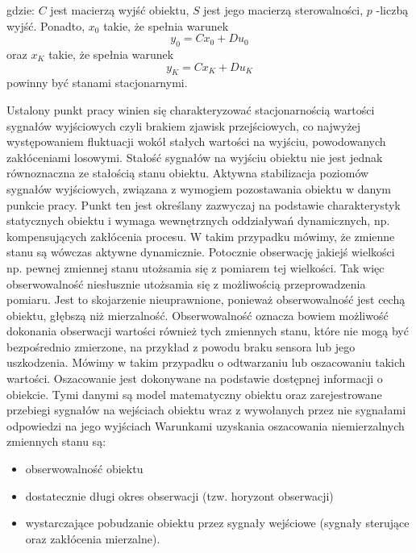 \documentclass{article}
\begin{document}
		gdzie: $C$ jest macierzą wyjść obiektu, $S$ jest jego macierzą sterowalności, $p$ -liczbą wyjść.
		Ponadto, $x_0$ takie, że spełnia warunek 
		\begin{equation}
			y_0 = C x_0+ D u_0
		\end{equation}
		oraz $x_K$ takie, że spełnia warunek
		\begin{equation}
			y_K = C x_K+ D u_K
		\end{equation}
		powinny być stanami stacjonarnymi.

		Ustalony punkt pracy winien się charakteryzować stacjonarnością wartości sygnałów
		wyjściowych czyli brakiem zjawisk przejściowych, co najwyżej występowaniem fluktuacji
		wokół stałych wartości na wyjściu, powodowanych zakłóceniami losowymi.
		Stałość sygnałów na wyjściu obiektu nie jest jednak równoznaczna ze stałością stanu
		obiektu.
		Aktywna stabilizacja poziomów sygnałów wyjściowych, związana z wymogiem
		pozostawania obiektu w danym punkcie pracy. Punkt ten jest określany zazwyczaj na podstawie
		charakterystyk statycznych obiektu i wymaga wewnętrznych oddziaływań
		dynamicznych, np. kompensujących zakłócenia procesu. W takim przypadku mówimy, że 
		zmienne stanu są wówczas aktywne dynamicznie.
		Potocznie obserwację jakiejś wielkości np. pewnej zmiennej stanu utożsamia się z
		pomiarem tej wielkości. Tak więc obserwowalność
		niesłusznie utożsamia się z możliwością przeprowadzenia pomiaru.
		Jest to skojarzenie nieuprawnione, ponieważ obserwowalność jest cechą
		obiektu, głębszą niż mierzalność. Obserwowalność oznacza bowiem możliwość
		dokonania obserwacji wartości również tych zmiennych stanu, które nie mogą być
		bezpośrednio zmierzone, na przykład z powodu braku sensora lub jego uszkodzenia.
		Mówimy w takim przypadku o odtwarzaniu lub oszacowaniu takich wartości.
		Oszacowanie jest dokonywane na podstawie dostępnej informacji o obiekcie. Tymi
		danymi są model matematyczny obiektu oraz zarejestrowane przebiegi sygnałów na
		wejściach obiektu wraz z wywołanych przez nie sygnałami odpowiedzi na jego wyjściach
		Warunkami uzyskania oszacowania niemierzalnych zmiennych stanu są:
		\begin{itemize}
			\item obserwowalność obiektu
			\item dostatecznie długi okres obserwacji (tzw. horyzont obserwacji)
			\item wystarczające pobudzanie obiektu przez sygnały wejściowe (sygnały sterujące
					oraz zakłócenia mierzalne).
		\end{itemize}
\end{document}

